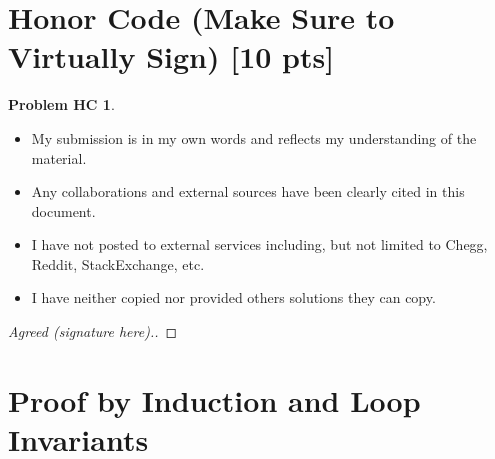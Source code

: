 \documentclass[11pt]{article}
\theoremstyle{definition}
\theoremstyle{definition}
\newtheorem*{requiredHC}{Problem HC}
\theoremstyle{definition}
\begin{document}
\section*{Honor Code (Make Sure to Virtually Sign) [10 pts]} \label{HonorCode} 

\begin{requiredHC}
\begin{itemize}
\item My submission is in my own words and reflects my understanding of the material.
\item Any collaborations and external sources have been clearly cited in this document.
\item I have not posted to external services including, but not limited to Chegg, Reddit, StackExchange, etc.
\item I have neither copied nor provided others solutions they can copy.
\end{itemize}

\end{requiredHC}

\begin{proof}[Agreed (signature here).]
\end{proof}


\newpage
\section{Proof by Induction and Loop Invariants}
\end{document}
